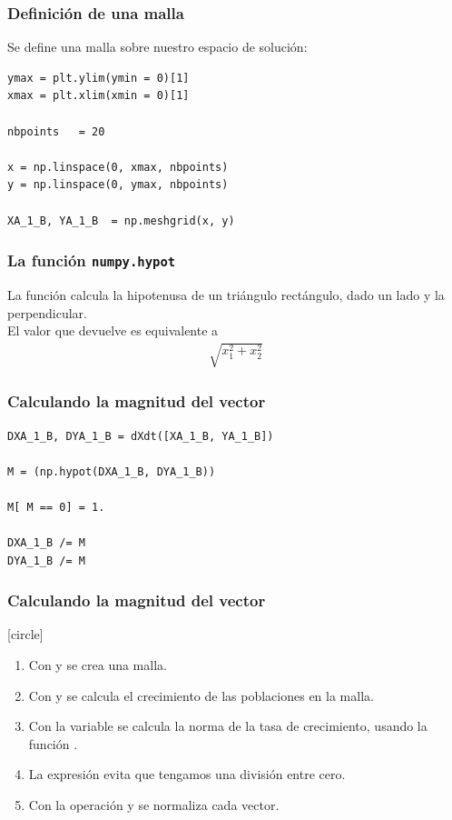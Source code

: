 \begin{frame}
\frametitle{Definición de una malla}
Se define una malla sobre nuestro espacio de solución:
\begin{lstlisting}[caption=Creando una malla, style=codigopython]
ymax = plt.ylim(ymin = 0)[1]
xmax = plt.xlim(xmin = 0)[1]

nbpoints   = 20

x = np.linspace(0, xmax, nbpoints)
y = np.linspace(0, ymax, nbpoints)

XA_1_B, YA_1_B  = np.meshgrid(x, y)
\end{lstlisting}
\end{frame}
\begin{frame}
\frametitle{La función \texttt{numpy.hypot}}
La función  calcula la hipotenusa de un triángulo rectángulo, dado un lado y la perpendicular.
\\
\bigskip
El valor que devuelve es equivalente a
\begin{align*}
\sqrt{x_{1}^{2} + x_{2}^{2}}
\end{align*}
\end{frame}
\begin{frame}[fragile]
\frametitle{Calculando la magnitud del vector}
\begin{lstlisting}[caption=Magnitud del vector y su dirección, style=codigopython]
DXA_1_B, DYA_1_B = dXdt([XA_1_B, YA_1_B])                      

M = (np.hypot(DXA_1_B, DYA_1_B))                           

M[ M == 0] = 1.                                 

DXA_1_B /= M                                        
DYA_1_B /= M
\end{lstlisting}
\end{frame}
\begin{frame}[fragile]
\frametitle{Calculando la magnitud del vector}
[circle]
\begin{enumerate}[<+->]
\item Con  y  se crea una malla. 
\item Con  y  se calcula el crecimiento de las poblaciones en la malla.
\item Con la variable  se calcula la norma de la tasa de crecimiento, usando la función .
\item La expresión  evita que tengamos una división entre cero.
\item Con la operación  y  se normaliza cada vector.
\end{enumerate}
\end{frame}
